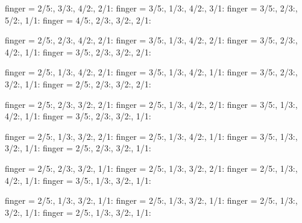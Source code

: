 \documentclass[../main.tex]{subfiles}
\begin{document}

  {finger = {2/5:\R, 3/3:, 4/2:, 2/1:}}
  {finger = {3/5:, 1/3:\R, 4/2:, 3/1:}}
  {finger = {3/5:, 2/3:, 5/2:, 1/1:\R}}
  {finger = {4/5:, 2/3:, 3/2:\R, 2/1:}}

  {finger = {2/5:\R, 2/3:, 4/2:, 2/1:}}
  {finger = {3/5:, 1/3:\R, 4/2:, 2/1:}}
  {finger = {3/5:, 2/3:, 4/2:, 1/1:\R}}
  {finger = {3/5:, 2/3:, 3/2:\R, 2/1:}}

  {finger = {2/5:\R, 1/3:, 4/2:, 2/1:}}
  {finger = {3/5:, 1/3:\R, 4/2:, 1/1:}}
  {finger = {3/5:, 2/3:, 3/2:, 1/1:\R}}
  {finger = {2/5:, 2/3:, 3/2:\R, 2/1:}}

  {finger = {2/5:\R, 2/3:, 3/2:, 2/1:}}
  {finger = {2/5:, 1/3:\R, 4/2:, 2/1:}}
  {finger = {3/5:, 1/3:, 4/2:, 1/1:\R}}
  {finger = {3/5:, 2/3:, 3/2:\R, 1/1:}}


  {finger = {2/5:\R, 1/3:, 3/2:, 2/1:}}
  {finger = {2/5:, 1/3:\R, 4/2:, 1/1:}}
  {finger = {3/5:, 1/3:, 3/2:, 1/1:\R}}
  {finger = {2/5:, 2/3:, 3/2:\R, 1/1:}}

  {finger = {2/5:\R, 2/3:, 3/2:, 1/1:}}
  {finger = {2/5:, 1/3:\R, 3/2:, 2/1:}}
  {finger = {2/5:, 1/3:, 4/2:, 1/1:\R}}
  {finger = {3/5:, 1/3:, 3/2:\R, 1/1:}}


  {finger = {2/5:\R, 1/3:, 3/2:, 1/1:}}
  {finger = {2/5:, 1/3:\R, 3/2:, 1/1:}}
  {finger = {2/5:, 1/3:, 3/2:, 1/1:\R}}
  {finger = {2/5:, 1/3:, 3/2:\R, 1/1:}}
\end{document}
